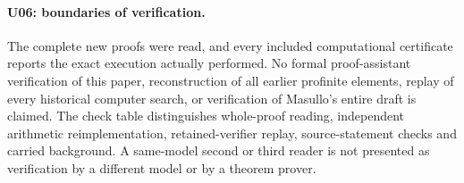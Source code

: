 \documentclass[11pt,a4paper]{article}
\begin{document}
\paragraph{U06: boundaries of verification.}
The complete new proofs were read, and every included computational
certificate reports the exact execution actually performed. No
formal proof-assistant verification of this paper, reconstruction
of all earlier profinite elements, replay of every historical
computer search, or verification of Masullo's entire draft is
claimed. The check table distinguishes whole-proof reading,
independent arithmetic reimplementation, retained-verifier replay,
source-statement checks and carried background. A same-model second
or third reader is not presented as verification by a different
model or by a theorem prover.

\clearpage
\end{document}
